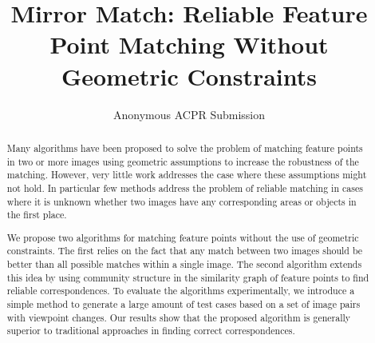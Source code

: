 \documentclass[conference]{IEEEtran}
\begin{document}
\title{Mirror Match: Reliable Feature Point Matching Without Geometric Constraints}
\author{Anonymous ACPR Submission}

\maketitle
%
\begin{abstract}
Many algorithms have been proposed to solve the problem of matching 
feature points in two or more images using geometric assumptions to 
increase the robustness of the matching. However, very little work 
addresses the case where these assumptions might not hold. In particular 
few methods address the problem of reliable matching in cases where it 
is unknown whether two images have any corresponding areas or objects in 
the first place. 

We propose two algorithms for matching feature points without the use of 
geometric constraints. The first relies on the fact that any match 
between two images should be better than all possible matches within a 
single image. The second algorithm extends this idea by using community 
structure in the similarity graph of feature points to find reliable 
correspondences. To evaluate the algorithms experimentally, we introduce 
a simple method to generate a large amount of test cases based on a set 
of image pairs with viewpoint changes. Our results show that the 
proposed algorithm is generally superior to traditional approaches in 
finding correct correspondences.
\end{abstract}
%
\end{document}
